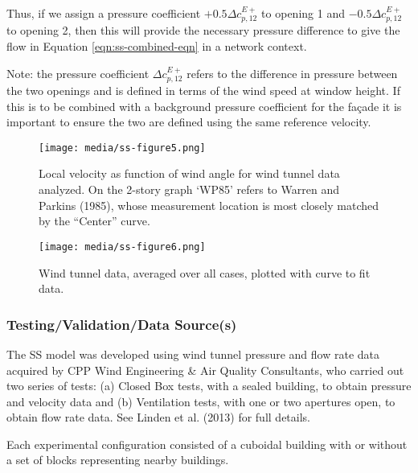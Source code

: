 Thus, if we assign a pressure coefficient $+0.5\Delta c_{p,12}^{E+}$ to opening 1 and $-0.5\Delta c_{p,12}^{E+}$ to opening 2, then this will provide the necessary pressure difference to give the flow in Equation \ref{eqn:ss-combined-eqn} in a network context.

Note: the pressure coefficient $\Delta c_{p,12}^{E+}$ refers to the difference in pressure between the two openings and is defined in terms of the wind speed at window height. If this is to be combined with a background pressure coefficient for the fa\c{c}ade it is important to ensure the two are defined using the same reference velocity.

\begin{figure}[hbtp] %
\centering
\texttt{[image: media/ss-figure5.png]}
\caption{Local velocity as function of wind angle for wind tunnel data analyzed. On the 2-story graph `WP85' refers to Warren and Parkins (1985), whose measurement location is most closely matched by the ``Center'' curve. \protect \label{fig:ss-local-velocity}}
\end{figure}
%
\begin{figure}[hbtp] %
\centering
\texttt{[image: media/ss-figure6.png]}
\caption{Wind tunnel data, averaged over all cases, plotted with curve to fit data. \protect \label{fig:ss-wind-tunnel-data}}
\end{figure}

\subsubsection{Testing/Validation/Data Source(s)}
The SS model was developed using wind tunnel pressure and flow rate data acquired by CPP Wind Engineering \& Air Quality Consultants, who carried out two series of tests: (a) Closed Box tests, with a sealed building, to obtain pressure and velocity data and (b) Ventilation tests, with one or two apertures open, to obtain flow rate data. See Linden et al. (2013) for full details.

Each experimental configuration consisted of a cuboidal building with or without a set of blocks representing nearby buildings. 

